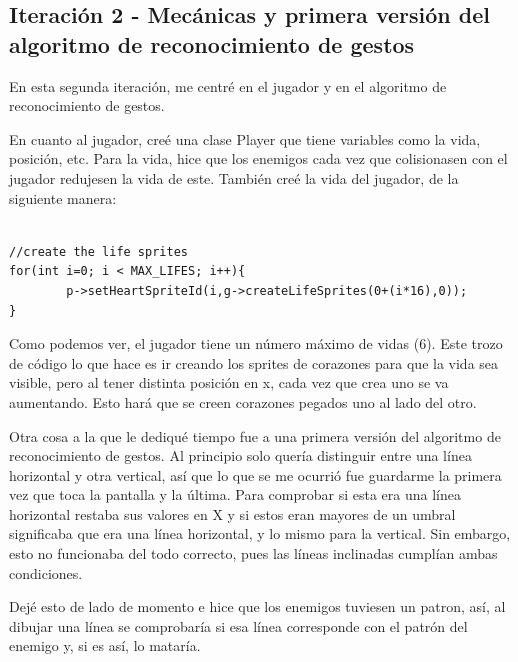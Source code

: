 \subsection{Iteración 2 - Mecánicas y primera versión del algoritmo de reconocimiento de gestos}

En esta segunda iteración, me centré en el jugador y en el algoritmo de reconocimiento de gestos.

\vspace{0.5cm}

En cuanto al jugador, creé una clase Player que tiene variables como la vida, posición, etc. Para la vida, hice que los enemigos cada vez que colisionasen con el jugador redujesen la vida de este. También creé la vida del jugador, de la siguiente manera:

\vspace{0.5cm}

\begin{lstlisting}[caption={Implementación del patrón Singleton}, label={code:singleton}]

//create the life sprites
for(int i=0; i < MAX_LIFES; i++){
		p->setHeartSpriteId(i,g->createLifeSprites(0+(i*16),0));
}
\end{lstlisting}

\vspace{0.5cm}

Como podemos ver, el jugador tiene un número máximo de vidas (6). Este trozo de código lo que hace es ir creando los sprites de corazones para que la vida sea visible, pero al tener distinta posición en x, cada vez que crea uno se va aumentando. Esto hará que se creen corazones pegados uno al lado del otro.

\vspace{0.5cm}

Otra cosa a la que le dediqué tiempo fue a una primera versión del algoritmo de reconocimiento de gestos. Al principio solo quería distinguir entre una línea horizontal y otra vertical, así que lo que se me ocurrió fue guardarme la primera vez que toca la pantalla y la última. Para comprobar si esta era una línea horizontal restaba sus valores en X y si estos eran mayores de un umbral significaba que era una línea horizontal, y lo mismo para la vertical. Sin embargo, esto no funcionaba del todo correcto, pues las líneas inclinadas cumplían ambas condiciones.

\vspace{0.5cm}

Dejé esto de lado de momento e hice que los enemigos tuviesen un patron, así, al dibujar una línea se comprobaría si esa línea corresponde con el patrón del enemigo y, si es así, lo mataría.

